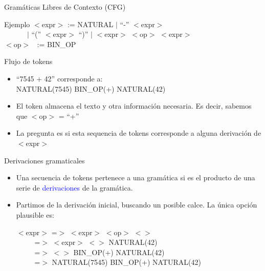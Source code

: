 \documentclass[handout]{beamer} %
\newcommand{\blue}[1]{\textcolor{blue}{#1}}
\newcommand{\redb}[1]{{\color{red!70!black}{#1}}}
\begin{document}
\begin{frame}{Gramáticas Libres de Contexto (CFG)}
    \begin{block}{Ejemplo}
        $<$expr$>$ := NATURAL $\mid$ ``-'' $<$expr$>$\\
        $~~~~~~~~~~~~~$ $\mid$ ``('' $<$expr$>$ ``)'' $\mid$ $<$expr$>$ $<$op$>$ $<$expr$>$\\
        $<$op$>$ $~$ := BIN\_OP
    \end{block}
    \pause
    \begin{block}{Flujo de tokens}
        \begin{itemize}
            \item ``7545 + 42'' corresponde a:\\
                  NATURAL(7545) BIN\_OP(+) NATURAL(42)
            \item El token almacena el texto y otra información necesaria. Es decir, sabemos que $<$op$>$ = ``+''
            \item La pregunta es si esta sequencia de tokens corresponde a alguna derivación de $<$expr$>$
        \end{itemize}
    \end{block}
\end{frame}

\begin{frame}{Derivaciones gramaticales}
    \begin{itemize}
        \item<1-> Una secuencia de tokens pertenece a una gramática si es el producto de una serie de \blue{derivaciones} de la gramática.
        \item<2-> Partimos de la derivación inicial, buscando un posible calce. La única opción plausible es:
        \medskip
        
        $<$expr$>$ =$>$ $<$expr$>$ $<$op$>$ $<$\redb{expr}$>$\\
        $~~~~~~~~~~$ =$>$ $<$expr$>$ $<$\redb{op}$>$ NATURAL(42)\\
        $~~~~~~~~~~$ =$>$ $<$\redb{expr}$>$ BIN\_OP(+) NATURAL(42)\\
        $~~~~~~~~~~$ =$>$ NATURAL(7545) BIN\_OP(+) NATURAL(42)
    \end{itemize}
\end{frame}
\end{document}
